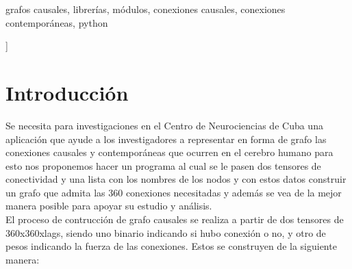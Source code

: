 \documentclass[a4paper,10pt,twocolumn]{article}
\begin{document}
\begin{keywords}
	grafos causales,
	librerías,
	módulos,
	conexiones causales,
	conexiones contemporáneas,
	python
\end{keywords}



\vspace{1.8cm}
]



\section*{Introducción}\label{sec:intro}

Se necesita para investigaciones en el Centro de Neurociencias de Cuba una aplicación que ayude
a los investigadores a representar en forma de grafo las conexiones causales y contemporáneas
que ocurren en el cerebro humano para esto nos proponemos hacer un programa al cual se le pasen
dos tensores de conectividad y una lista con los nombres de los nodos y con estos datos construir
un grafo que admita las 360 conexiones necesitadas y además se vea de la mejor manera posible
para apoyar su estudio y análisis.\\

El proceso de contrucción de grafo causales se realiza a partir de dos tensores de 360x360xlags,
siendo uno binario indicando si hubo conexión o no, y otro de pesos indicando la fuerza de las
conexiones. Estos se construyen de la siguiente manera:
\end{document}
